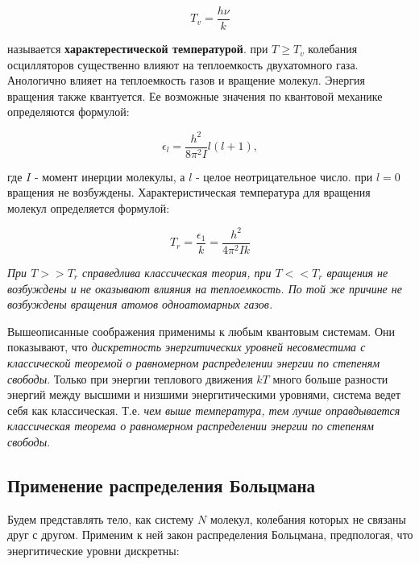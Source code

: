 \begin{equation}
    T_v = \frac {h\nu}{k}
    \label{TvOsc}
\end{equation}

называется \textbf {характерестической температурой}. при $ T \geq T_v $ колебания осцилляторов существенно влияют на теплоемкость двухатомного газа. \\ [0.2cm]

Анологично влияет на теплоемкость газов и вращение молекул. Энергия вращения также квантуется. Ее возможные значения по квантовой механике определяются формулой:

\begin{equation}
    \epsilon_l = \frac {h^2}{8\pi^2I}l(l + 1),
    \label{rotEn}
\end{equation}

где $ I $ - момент инерции молекулы, а $ l $ - целое неотрицательное число. при $ l = 0 $ вращения не возбуждены. Характеристическая температура для вращения молекул определяется формулой:

\begin{equation}
    T_r = \frac {\epsilon_1}{k} = \frac {h^2}{4\pi^2Ik}
    \label{TvRot}
\end{equation}

\textit {При $ T >> T_r $ справедлива классическая теория, при $ T << T_r $ вращения не возбуждены и не оказывают влияния на теплоемкость. По той же причине не возбуждены вращения атомов одноатомарных газов.} \\ [0.2cm]

\newpage

Вышеописанные соображения применимы к любым квантовым системам. Они показывают, что \textit {дискретность энергитических уровней несовместима с классической теоремой о равномерном распределении энергии по степеням свободы}. Только при энергии теплового движения $ kT $ много больше разности энергий между высшими и низшими энергитическими уровнями, система ведет себя как классическая. Т.е. \textit {чем выше температура, тем лучше оправдывается классическая теорема о равномерном распределении энергии по степеням свободы}.

\subsection {Применение распределения Больцмана}

Будем представлять тело, как систему $ N $ молекул, колебания которых не связаны друг с другом. Применим к ней закон распределения Больцмана, предпологая, что энергитические уровни дискретны:

